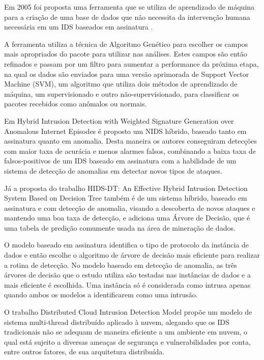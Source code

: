 \documentclass[openright]{normas-utf-tex} %
\begin{document}
	Em 2005 foi proposta uma ferramenta que se utiliza de aprendizado de máquina para a criação de uma base de dados que não necessita da intervenção humana necessária em um IDS baseados em assinatura \cite{machinega}.
	
	A ferramenta utiliza a técnica de Algoritmo Genético para escolher os campos mais apropriados do pacote para utilizar nas análises. Estes campos são então refinados e passam por um filtro para aumentar a performance da próxima etapa, na qual os dados são enviados para uma versão aprimorada de Support Vector Machine (SVM), um algoritmo que utiliza dois métodos de aprendizado de máquina, um supervisionado e outro não-supervisionado, para classificar os pacotes recebidos como anômalos ou normais.
	
	Em Hybrid Intrusion Detection with Weighted
Signature Generation over Anomalous
Internet Episodes \cite{hybrid} é proposto um NIDS híbrido, baseado tanto em assinatura quanto em anomalia. Desta maneira os autores conseguiram detecções com maior taxa de acurácia e menos alarmes falsos, combinando a baixa taxa de falsos-positivos de um IDS baseado em assinatura com a habilidade de um sistema de detecção de anomalias em detectar novos tipos de ataques.
	
	Já a proposta do trabalho HIDS-DT: An Effective Hybrid Intrusion Detection System Based on Decision Tree \cite{tree} também é de um sistema híbrido, baseado em assinatura e com detecção de anomalia, visando a descoberta de novos ataques e mantendo uma boa taxa de detecção, e adiciona uma Árvore de Decisão, que é uma tabela de predição comumente usada na área de mineração de dados.
	
	O modelo baseado em assinatura identifica o tipo de protocolo da instância de dados e então escolhe o algoritmo de árvore de decisão mais eficiente para realizar a rotina de detecção. No modelo baseado em detecção de anomalia, as três árvores de decisão que o estudo utiliza são testadas nas instâncias de dados e a mais eficiente é escolhida. Uma instância só é considerada como intrusa apenas quando ambos os modelos a identificarem como uma intrusão.
	
	O trabalho Distributed Cloud Intrusion Detection Model \cite{cloud} propõe um modelo de sistema multi-thread distribuído aplicado à nuvem, alegando que os IDS tradicionais não se adequam de maneira eficiente a um ambiente em nuvem, o qual está sujeito a diversas ameaças de segurança e vulnerabilidades por conta, entre outros fatores, de sua arquitetura distribuída.
	
\end{document}
